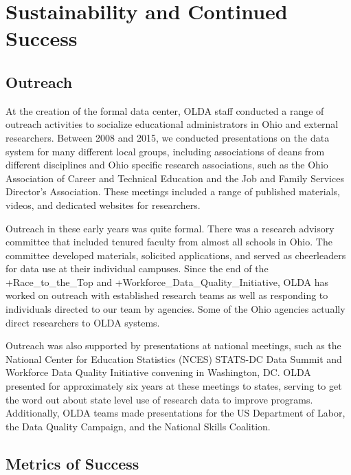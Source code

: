 \documentclass[
]{book}
\begin{document}
\hypertarget{sustainability-and-continued-success-1}{%
\section{Sustainability and Continued Success}\label{sustainability-and-continued-success-1}}

\hypertarget{outreach-1}{%
\subsection{Outreach}\label{outreach-1}}

At the creation of the formal data center, OLDA staff conducted a range of outreach activities to socialize educational administrators in Ohio and external researchers. Between 2008 and 2015, we conducted presentations on the data system for many different local groups, including associations of deans from different disciplines and Ohio specific research associations, such as the Ohio Association of Career and Technical Education and the Job and Family Services Director's Association. These meetings included a range of published materials, videos, and dedicated websites for researchers.

Outreach in these early years was quite formal. There was a research advisory committee that included tenured faculty from almost all schools in Ohio. The committee developed materials, solicited applications, and served as cheerleaders for data use at their individual campuses. Since the end of the +Race\_to\_the\_Top\textbar{} and +Workforce\_Data\_Quality\_Initiative\textbar, OLDA has worked on outreach with established research teams as well as responding to individuals directed to our team by agencies. Some of the Ohio agencies actually direct researchers to OLDA systems.

Outreach was also supported by presentations at national meetings, such as the National Center for Education Statistics (NCES) STATS-DC Data Summit and Workforce Data Quality Initiative convening in Washington, DC. OLDA presented for approximately six years at these meetings to states, serving to get the word out about state level use of research data to improve programs. Additionally, OLDA teams made presentations for the US Department of Labor, the Data Quality Campaign, and the National Skills Coalition.

\hypertarget{metrics-of-success-1}{%
\subsection{Metrics of Success}\label{metrics-of-success-1}}
\end{document}
